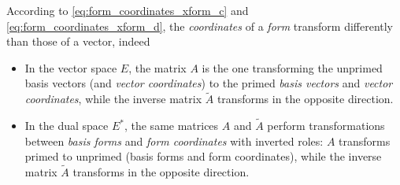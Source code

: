 According to \ref{eq:form_coordinates_xform_c} and \ref{eq:form_coordinates_xform_d}, the \textit{coordinates} of a \textit{form} transform differently than those of a vector, indeed
\begin{itemize}
\item In the vector space $E$, the matrix $A$ is the one transforming the unprimed basis vectors (and \textit{vector coordinates}) to the primed \textit{basis vectors} and \textit{vector coordinates}, while the inverse matrix $\tilde{A}$ transforms in the opposite direction.
\item In the dual space $E^*$, the same matrices $A$ and $\tilde{A}$ perform transformations between \textit{basis forms} and \textit{form  coordinates} with inverted roles: $A$ transforms primed to unprimed (basis forms and form coordinates), while the inverse matrix $\tilde{A}$ transforms in the opposite direction.  
\end{itemize} 

   
